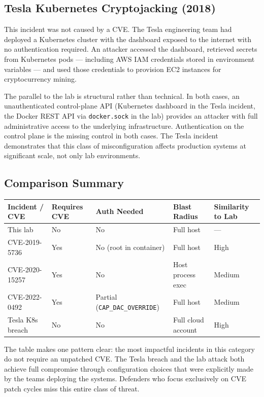 \subsection{Tesla Kubernetes Cryptojacking (2018)}

This incident was not caused by a CVE. The Tesla engineering team had deployed a Kubernetes cluster with the dashboard exposed to the internet with no authentication required. An attacker accessed the dashboard, retrieved secrets from Kubernetes pods --- including AWS IAM credentials stored in environment variables --- and used those credentials to provision EC2 instances for cryptocurrency mining.

The parallel to the lab is structural rather than technical. In both cases, an unauthenticated control-plane API (Kubernetes dashboard in the Tesla incident, the Docker REST API via \texttt{docker.sock} in the lab) provides an attacker with full administrative access to the underlying infrastructure. Authentication on the control plane is the missing control in both cases. The Tesla incident demonstrates that this class of misconfiguration affects production systems at significant scale, not only lab environments.

\subsection{Comparison Summary}

\begin{center}
\begin{tabular}{p{3.5cm}p{2cm}p{2cm}p{2.5cm}p{2.5cm}}
\hline
\textbf{Incident / CVE} & \textbf{Requires CVE} & \textbf{Auth Needed} & \textbf{Blast Radius} & \textbf{Similarity to Lab} \\
\hline
This lab & No & No & Full host & --- \\
CVE-2019-5736 & Yes & No (root in container) & Full host & High \\
CVE-2020-15257 & Yes & No & Host process exec & Medium \\
CVE-2022-0492 & Yes & Partial (\texttt{CAP\_DAC\_OVERRIDE}) & Full host & Medium \\
Tesla K8s breach & No & No & Full cloud account & High \\
\hline
\end{tabular}
\end{center}

The table makes one pattern clear: the most impactful incidents in this category do not require an unpatched CVE. The Tesla breach and the lab attack both achieve full compromise through configuration choices that were explicitly made by the teams deploying the systems. Defenders who focus exclusively on CVE patch cycles miss this entire class of threat.

